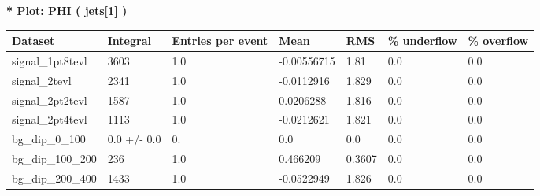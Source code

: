 \documentclass[a4paper, 10pt]{article}
\begin{document}
\textbf{* Plot: PHI ( jets[1] ) }\\
   \begin{table}[H]
  \begin{center}
    \begin{tabular}{|m{23.0mm}|m{23.0mm}|m{18.0mm}|m{19.0mm}|m{19.0mm}|m{19.0mm}|m{19.0mm}|}
      \hline
      {\cellcolor{yellow}         Dataset}& {\cellcolor{yellow}         Integral}& {\cellcolor{yellow}         Entries per event}& {\cellcolor{yellow}         Mean}& {\cellcolor{yellow}         RMS}& {\cellcolor{yellow}         \% underflow}& {\cellcolor{yellow}         \% overflow}\\
      \hline
      {\cellcolor{white}         signal\_1pt8tevl}& {\cellcolor{white}         3603}& {\cellcolor{white}         1.0}& {\cellcolor{white}         -0.00556715}& {\cellcolor{white}         1.81}& {\cellcolor{green}         0.0}& {\cellcolor{green}         0.0}\\
      \hline
      {\cellcolor{white}         signal\_2tevl}& {\cellcolor{white}         2341}& {\cellcolor{white}         1.0}& {\cellcolor{white}         -0.0112916}& {\cellcolor{white}         1.829}& {\cellcolor{green}         0.0}& {\cellcolor{green}         0.0}\\
      \hline
      {\cellcolor{white}         signal\_2pt2tevl}& {\cellcolor{white}         1587}& {\cellcolor{white}         1.0}& {\cellcolor{white}         0.0206288}& {\cellcolor{white}         1.816}& {\cellcolor{green}         0.0}& {\cellcolor{green}         0.0}\\
      \hline
      {\cellcolor{white}         signal\_2pt4tevl}& {\cellcolor{white}         1113}& {\cellcolor{white}         1.0}& {\cellcolor{white}         -0.0212621}& {\cellcolor{white}         1.821}& {\cellcolor{green}         0.0}& {\cellcolor{green}         0.0}\\
      \hline
      {\cellcolor{white}         bg\_dip\_0\_100}& {\cellcolor{white}         0.0 +/\-- 0.0}& {\cellcolor{white}         0.}& {\cellcolor{white}         0.0}& {\cellcolor{white}         0.0}& {\cellcolor{green}         0.0}& {\cellcolor{green}         0.0}\\
      \hline
      {\cellcolor{white}         bg\_dip\_100\_200}& {\cellcolor{white}         236}& {\cellcolor{white}         1.0}& {\cellcolor{white}         0.466209}& {\cellcolor{white}         0.3607}& {\cellcolor{green}         0.0}& {\cellcolor{green}         0.0}\\
      \hline
      {\cellcolor{white}         bg\_dip\_200\_400}& {\cellcolor{white}         1433}& {\cellcolor{white}         1.0}& {\cellcolor{white}         -0.0522949}& {\cellcolor{white}         1.826}& {\cellcolor{green}         0.0}& {\cellcolor{green}         0.0}\\

\end{tabular}
\end{center}
\end{table}
\end{document}
